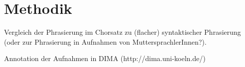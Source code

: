 \chapter{Methodik}
\label{chap:Methodik}
\pagestyle{plain}

Vergleich der Phrasierung im Chorsatz zu (flacher) syntaktischer Phrasierung (oder zur Phrasierung in Aufnahmen von MuttersprachlerInnen?).

Annotation der Aufnahmen in DIMA (http://dima.uni-koeln.de/)